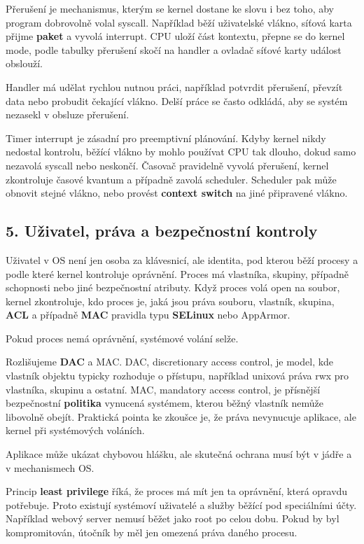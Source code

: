 \documentclass[11pt,a4paper]{article}
\begin{document}
Přerušení je mechanismus, kterým se kernel dostane ke slovu i bez toho, aby program dobrovolně volal syscall. Například běží uživatelské vlákno, síťová karta přijme \textbf{paket} a vyvolá interrupt. CPU uloží část kontextu, přepne se do kernel mode, podle tabulky přerušení skočí na handler a ovladač síťové karty událost obslouží.

Handler má udělat rychlou nutnou práci, například potvrdit přerušení, převzít data nebo probudit čekající vlákno. Delší práce se často odkládá, aby se systém nezasekl v obsluze přerušení.

Timer interrupt je zásadní pro preemptivní plánování. Kdyby kernel nikdy nedostal kontrolu, běžící vlákno by mohlo používat CPU tak dlouho, dokud samo nezavolá syscall nebo neskončí. Časovač pravidelně vyvolá přerušení, kernel zkontroluje časové kvantum a případně zavolá scheduler. Scheduler pak může obnovit stejné vlákno, nebo provést \textbf{context switch} na jiné připravené vlákno.

\subsection*{5. Uživatel, práva a bezpečnostní kontroly}

Uživatel v OS není jen osoba za klávesnicí, ale identita, pod kterou běží procesy a podle které kernel kontroluje oprávnění. Proces má vlastníka, skupiny, případně schopnosti nebo jiné bezpečnostní atributy. Když proces volá open na soubor, kernel zkontroluje, kdo proces je, jaká jsou práva souboru, vlastník, skupina, \textbf{ACL} a případně \textbf{MAC} pravidla typu \textbf{SELinux} nebo AppArmor.

Pokud proces nemá oprávnění, systémové volání selže.

Rozlišujeme \textbf{DAC} a MAC. DAC, discretionary access control, je model, kde vlastník objektu typicky rozhoduje o přístupu, například unixová práva rwx pro vlastníka, skupinu a ostatní. MAC, mandatory access control, je přísnější bezpečnostní \textbf{politika} vynucená systémem, kterou běžný vlastník nemůže libovolně obejít. Praktická pointa ke zkoušce je, že práva nevynucuje aplikace, ale kernel při systémových voláních.

Aplikace může ukázat chybovou hlášku, ale skutečná ochrana musí být v jádře a v mechanismech OS.

Princip \textbf{least privilege} říká, že proces má mít jen ta oprávnění, která opravdu potřebuje. Proto existují systémoví uživatelé a služby běžící pod speciálními účty. Například webový server nemusí běžet jako root po celou dobu. Pokud by byl kompromitován, útočník by měl jen omezená práva daného procesu.
\end{document}
